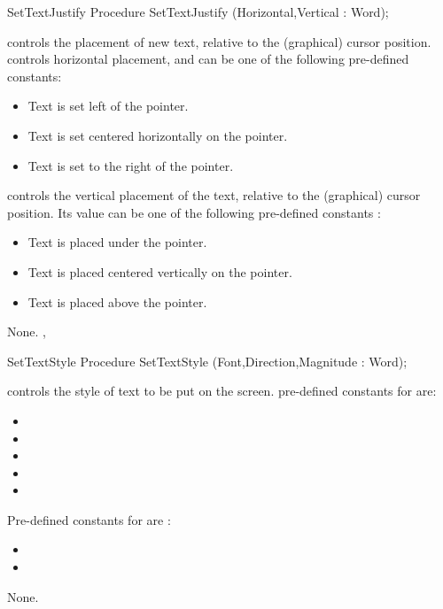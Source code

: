 \begin{procedure}{SetTextJustify}
\Declaration
Procedure SetTextJustify (Horizontal,Vertical : Word);

\Description
{} controls the placement of new text, relative to the 
(graphical) cursor position.  controls horizontal placement, and can be
one of the following pre-defined constants:
\begin{itemize}
\item {} Text is set left of the pointer.
\item {} Text is set centered horizontally on the pointer.
\item {} Text is set to the right of the pointer.
\end{itemize}
 controls the vertical placement of the text, relative to the
(graphical) cursor position. Its value can be one of the following
pre-defined constants :
\begin{itemize}
\item {} Text is placed under the pointer.
\item {} Text is placed centered vertically on the pointer.
\item {}Text is placed above the pointer.
\end{itemize}

\Errors
None.
\SeeAlso
{}, 
\end{procedure}
\begin{procedure}{SetTextStyle}
\Declaration
Procedure SetTextStyle (Font,Direction,Magnitude : Word);

\Description
{} controls the style of text to be put on the screen.
pre-defined constants for  are:
\begin{itemize}
\item {}
\item {}
\item {}
\item {}
\item {}
\end{itemize}
Pre-defined constants for  are :
\begin{itemize}
\item {}
\item {}
\end{itemize}
\Errors
None.
\SeeAlso
{} 
\end{procedure}
